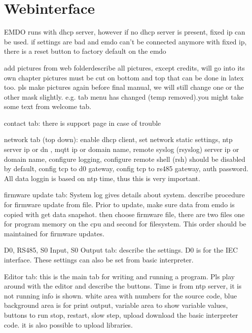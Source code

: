 \documentclass[11pt,fleqn]{book} %
\numberwithin{equation}{section} %
\numberwithin{figure}{section} %
\numberwithin{table}{section} %
\begin{document}

\chapter{Webinterface}

EMDO runs with dhcp server, however if no dhcp server is present, fixed ip can be used.
if settings are bad and emdo can't be connected anymore with fixed ip, there is a reset button to factory default on the emdo

add pictures from web folderdescribe all pictures, except credits, will go into its own chapter
pictures must be cut on bottom and top that can be done in latex too. pls make pictures again before final manual, we will still change one or the other mask slightly. e.g. tab menu has changed (temp removed).you might take some text from welcome tab.

contact tab: there is support page in case of trouble

network tab (top down): enable dhcp client, set network static settings, ntp server ip or dn , mqtt ip or domain name, remote syslog (rsyslog) server ip or domain name, configure logging, configure remote shell (rsh) should be disabled by default, config tcp to d0 gateway, config tcp to rs485 gateway, auth password.
All data loggin is based on ntp time, thus this is very important.

firmware update tab: System log gives details about system. describe procedure for firmware update from file. Prior to update, make sure data from emdo is copied with get data snapshot. then choose firmware file, there are two files one for program memory on the cpu and second for filesystem. This order should be maintained for firmware updates. 

D0, RS485, S0 Input, S0 Output tab: describe the settings. D0 is for the IEC interface. These settings can also be set from basic interpreter. 

Editor tab: this is the main tab for writing and running a program.  Pls play around with the editor and  describe the buttons. Time is from ntp server, it is not running info is shown. white area with numbers for the source code, blue background area is for print output, variable area to show variable values, buttons to run stop, restart, slow step, upload download the basic interpreter code. it is also possible to upload libraries.
\end{document}
